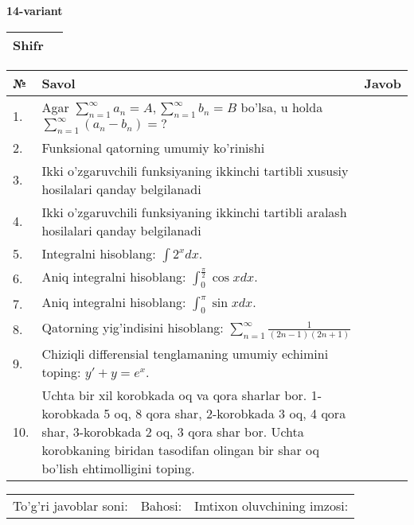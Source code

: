 \documentclass{article}
\begin{document}
  \egroup
  
  \newpage
  
  
  \textbf{14-variant}\\
  
  \bgroup
  \def\arraystretch{1.6} %
  
  \begin{tabular}{|m{5.7cm}|m{9.5cm}|}
  \hline
  Shifr & \\
  \hline
  \end{tabular}
  
  \vspace{1cm}
  
  \begin{tabular}{|m{0.7cm}|m{10cm}|m{4cm}|}
  \hline
  № & Savol & Javob \\
  \hline
  1. & Agar \(\sum_{n = 1}^{\infty}a_{n} = A,\sum_{n = 1}^{\infty}b_{n} = B\) bo'lsa, u holda \(\sum_{n = 1}^{\infty}\left( a_{n} - b_{n} \right) = ?\) &  \\
  \hline
  2. & Funksional qatorning umumiy ko'rinishi &  \\
  \hline
  3. & Ikki o'zgaruvchili funksiyaning ikkinchi tartibli xususiy hosilalari qanday belgilanadi &  \\
  \hline
  4. & Ikki o'zgaruvchili funksiyaning ikkinchi tartibli aralash hosilalari qanday belgilanadi &  \\
  \hline
  5. & Integralni hisoblang: \(\int {2^{x}dx}\). &  \\
  \hline
  6. & Aniq integralni hisoblang: \(\int_{0}^{\frac{\pi}{2}}{\cos xdx}\). &  \\
  \hline
  7. & Aniq integralni hisoblang: \(\int_{0}^{\pi}{\sin xdx}\). &  \\
  \hline
  8. & Qatorning yig'indisini hisoblang: \(\sum_{n = 1}^{\infty}\frac{1}{(2n - 1)(2n + 1)}\) &  \\
  \hline
  9. & Chiziqli differensial tenglamaning umumiy echimini toping: \(y' + y = e^{x}\). &  \\
  \hline
  10. & Uchta bir xil korobkada oq va qora sharlar bor. 1-korobkada 5 oq, 8 qora shar, 2-korobkada 3 oq, 4 qora shar, 3-korobkada 2 oq, 3 qora shar bor. Uchta korobkaning biridan tasodifan olingan bir shar oq bo'lish ehtimolligini toping. &  \\
  \hline
  \end{tabular}
  
  \vspace{1cm}
  
  \begin{tabular}{lll}
  To'g'ri javoblar soni: \underline{\hspace{1.5cm}} & 
  Bahosi: \underline{\hspace{1.5cm}} & 
  Imtixon oluvchining imzosi: \underline{\hspace{2cm}} \\
  \end{tabular}
  
\end{document}
